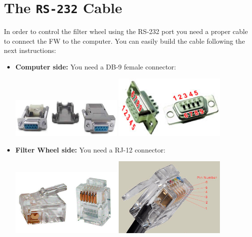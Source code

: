 \documentclass[a4paper,10pt]{article}
\begin{document}
\clearpage 

\section{The \texttt{RS-232} Cable}

In order to control the filter wheel using the RS-232 port you need a proper cable to connect the FW to the computer. You can easily build the cable following the next instructions:

\begin{itemize}
  \item \textbf{Computer side:} You need a DB-9 female connector:
  
  \begin{center}
    \includegraphics[width=5.5cm]{./DB9_connector.jpg}
    \hfill
    \includegraphics[width=5.5cm]{./DB9_connector02.jpg}
  \end{center}
  
  \item \textbf{Filter Wheel side:} You need a RJ-12 connector:
  
  \begin{center}
    \includegraphics[width=5.5cm]{./rj12.jpg}
    \hfill
    \includegraphics[width=5.5cm]{./rj12_pinout.jpg}
  \end{center}


\end{itemize}
\end{document}

